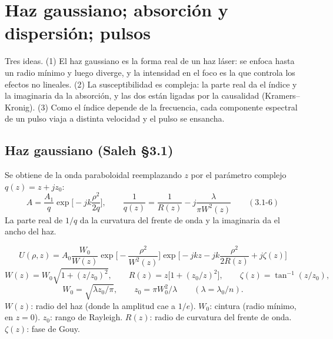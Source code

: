 \documentclass[10pt]{article}
\begin{document}
\section{Haz gaussiano; absorción y dispersión; pulsos}

\begin{idea}
Tres ideas. (1) El haz gaussiano es la forma real de un haz láser: se enfoca hasta un radio mínimo y luego diverge, y la intensidad en el foco es la que controla los efectos no lineales. (2) La susceptibilidad es compleja: la parte real da el índice y la imaginaria da la absorción, y las dos están ligadas por la causalidad (Kramers–Kronig). (3) Como el índice depende de la frecuencia, cada componente espectral de un pulso viaja a distinta velocidad y el pulso se ensancha.
\end{idea}

\subsection{Haz gaussiano (Saleh §3.1)}
Se obtiene de la onda paraboloidal reemplazando $z$ por el parámetro complejo $q(z)=z+jz_0$:
\[
A=\frac{A_1}{q}\exp\!\Big[-jk\frac{\rho^2}{2q}\Big],\qquad \frac1{q(z)}=\frac1{R(z)}-j\frac{\lambda}{\pi W^2(z)}\qquad(3.1\text{-}6)
\]
La parte real de $1/q$ da la curvatura del frente de onda y la imaginaria da el ancho del haz.

\begin{clave}[title={Amplitud compleja del haz gaussiano (3.1-7)}]
\[
U(\rho,z)=A_0\frac{W_0}{W(z)}\exp\!\Big[-\frac{\rho^2}{W^2(z)}\Big]\exp\!\Big[-jkz-jk\frac{\rho^2}{2R(z)}+j\zeta(z)\Big]
\]
\[
W(z)=W_0\sqrt{1+(z/z_0)^2},\qquad R(z)=z\big[1+(z_0/z)^2\big],\qquad \zeta(z)=\tan^{-1}(z/z_0),
\]
\[
W_0=\sqrt{\lambda z_0/\pi},\qquad z_0=\pi W_0^2/\lambda\qquad(\lambda=\lambda_0/n).
\]
$W(z)$: radio del haz (donde la amplitud cae a $1/e$). $W_0$: cintura (radio mínimo, en $z=0$). $z_0$: rango de Rayleigh. $R(z)$: radio de curvatura del frente de onda. $\zeta(z)$: fase de Gouy.
\end{clave}
\end{document}
